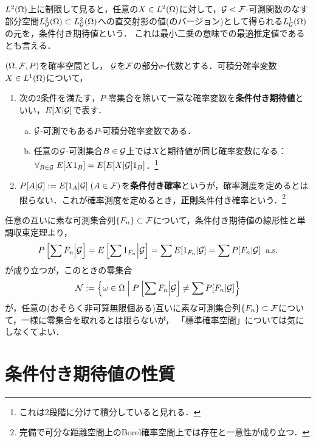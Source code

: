 \documentclass[uplatex,dvipdfmx]{jsreport}
\begin{document}
\begin{tcolorbox}[colframe=ForestGreen, colback=ForestGreen!10!white,breakable,colbacktitle=ForestGreen!40!white,coltitle=black,fonttitle=\bfseries\sffamily,
title=]
    $L^2(\Omega)$上に制限して見ると，任意の$X\in L^2(\Omega)$に対して，$\mathcal{G}<\mathcal{F}$-可測関数のなす部分空間$L_{\mathcal{G}}^2(\Omega)\subset L_{\mathcal{G}}^2(\Omega)$への直交射影の値(のバージョン)として得られる$L_{\mathcal{G}}^1(\Omega)$の元を，条件付き期待値という．
    これは最小二乗の意味での最適推定値であるとも言える．
\end{tcolorbox}

\begin{definition}
    $(\Omega,\mathcal{F},P)$を確率空間とし，
    $\mathcal{G}$を$\mathcal{F}$の部分$\sigma$-代数とする．可積分確率変数$X\in L^1(\Omega)$について，
    \begin{enumerate}
        \item 次の2条件を満たす，$P$-零集合を除いて一意な確率変数を\textbf{条件付き期待値}といい，$E[X|\mathcal{G}]$で表す．
        \begin{enumerate}[(a)]
            \item $\mathcal{G}$-可測でもある$P$-可積分確率変数である．
            \item 任意の$\mathcal{G}$-可測集合$B\in\mathcal{G}$上では$X$と期待値が同じ確率変数になる：
            $\forall_{B\in\mathcal{G}}\;E[X1_B]=E[E[X|\mathcal{G}]1_B]$．\footnote{これは2段階に分けて積分していると見れる．}
        \end{enumerate}
        \item $P[A|\mathcal{G}]:=E[1_A|\mathcal{G}]\;(A\in\mathcal{F})$を\textbf{条件付き確率}というが，確率測度を定めるとは限らない．これが確率測度を定めるとき，\textbf{正則}条件付き確率という．\footnote{完備で可分な距離空間上のBorel確率空間上では存在と一意性が成り立つ．}
    \end{enumerate}
\end{definition}
\begin{remark}[正則条件付き確率]
    任意の互いに素な可測集合列$\{F_n\}\subset\mathcal{F}$について，条件付き期待値の線形性と単調収束定理より，
    \[P\left[\sum F_n\middle|\mathcal{G}\right]=E\left[\sum 1_{F_n}\middle|\mathcal{G}\right]=\sum E[1_{F_n}|\mathcal{G}]=\sum P[F_n|\mathcal{G}]\;\;\mathrm{a.s.}\]
    が成り立つが，このときの零集合
    \[\mathcal{N}:=\left\{\omega\in\Omega\;\middle|\;P\left[\sum F_n\middle|\mathcal{G}\right]\ne \sum P[F_n|\mathcal{G}]\right\}\]
    が，任意の(おそらく非可算無限個ある)互いに素な可測集合列$\{F_n\}\subset\mathcal{F}$について，一様に零集合を取れるとは限らないが，
    「標準確率空間」については気にしなくてよい．
\end{remark}

\section{条件付き期待値の性質}
\end{document}
